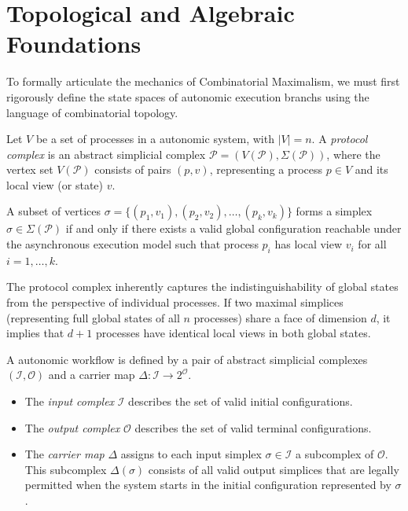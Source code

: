 \section{Topological and Algebraic Foundations}

To formally articulate the mechanics of Combinatorial Maximalism, we must first rigorously define the state spaces of autonomic execution branchs using the language of combinatorial topology.

\begin{definition}
Let $V$ be a set of processes in a autonomic system, with $|V| = n$. A \textit{protocol complex} is an abstract simplicial complex $\mathcal{P} = (V(\mathcal{P}), \Sigma(\mathcal{P}))$, where the vertex set $V(\mathcal{P})$ consists of pairs $(p, v)$, representing a process $p \in V$ and its local view (or state) $v$. 

A subset of vertices $\sigma = \{(p_1, v_1), (p_2, v_2), \dots, (p_k, v_k)\}$ forms a simplex $\sigma \in \Sigma(\mathcal{P})$ if and only if there exists a valid global configuration reachable under the asynchronous execution model such that process $p_i$ has local view $v_i$ for all $i = 1, \dots, k$. 
\end{definition}

The protocol complex inherently captures the indistinguishability of global states from the perspective of individual processes. If two maximal simplices (representing full global states of all $n$ processes) share a face of dimension $d$, it implies that $d+1$ processes have identical local views in both global states.

\begin{definition}
A autonomic workflow is defined by a pair of abstract simplicial complexes $(\mathcal{I}, \mathcal{O})$ and a carrier map $\Delta: \mathcal{I} \to 2^{\mathcal{O}}$. 
\begin{itemize}
    \item The \textit{input complex} $\mathcal{I}$ describes the set of valid initial configurations.
    \item The \textit{output complex} $\mathcal{O}$ describes the set of valid terminal configurations.
    \item The \textit{carrier map} $\Delta$ assigns to each input simplex $\sigma \in \mathcal{I}$ a subcomplex of $\mathcal{O}$. This subcomplex $\Delta(\sigma)$ consists of all valid output simplices that are legally permitted when the system starts in the initial configuration represented by $\sigma$.
\end{itemize}
\end{definition}

